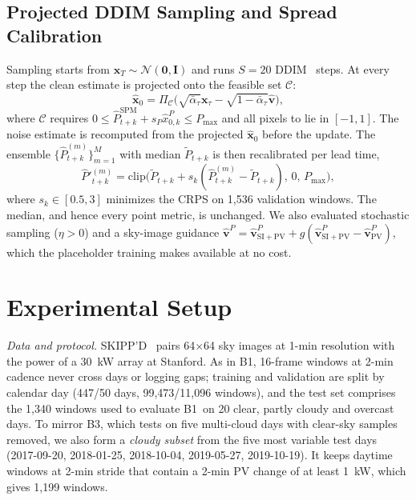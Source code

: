 \documentclass[conference]{IEEEtran}
\newcommand{\Pspm}{\hat P^{\mathrm{SPM}}}
\newcommand{\BOne}{B1}
\newcommand{\BThree}{B3}
\begin{document}
\subsection{Projected DDIM Sampling and Spread Calibration}
Sampling starts from $\mathbf x_T\sim\mathcal N(\mathbf 0,\mathbf I)$ and runs $S=20$ DDIM~\cite{song2021ddim} steps. At every step the clean estimate is projected onto the feasible set $\mathcal C$:
\begin{equation}
\hat{\mathbf x}_0=\Pi_{\mathcal C}\big(\sqrt{\bar\alpha_\tau}\mathbf x_\tau-\sqrt{1-\bar\alpha_\tau}\hat{\mathbf v}\big),
\end{equation}
where $\mathcal C$ requires $0\le\Pspm_{t+k}+s_P\hat x^P_{0,k}\le P_{\max}$ and all pixels to lie in $[-1,1]$. The noise estimate is recomputed from the projected $\hat{\mathbf x}_0$ before the update. The ensemble $\{\hat P^{(m)}_{t+k}\}_{m=1}^{M}$ with median $\tilde P_{t+k}$ is then recalibrated per lead time,
\begin{equation}
\hat P'^{(m)}_{t+k}=\mathrm{clip}\big(\tilde P_{t+k}+s_k(\hat P^{(m)}_{t+k}-\tilde P_{t+k}),\,0,\,P_{\max}\big),
\label{eq:cal}
\end{equation}
where $s_k\in[0.5,3]$ minimizes the CRPS on 1{,}536 validation windows. The median, and hence every point metric, is unchanged. We also evaluated stochastic sampling ($\eta>0$) and a sky-image guidance $\hat{\mathbf v}^P=\hat{\mathbf v}^P_{\mathrm{SI+PV}}+g(\hat{\mathbf v}^P_{\mathrm{SI+PV}}-\hat{\mathbf v}^P_{\mathrm{PV}})$, which the placeholder training makes available at no cost.

\section{Experimental Setup}
\emph{Data and protocol.} SKIPP'D~\cite{nie2023skippd} pairs 64$\times$64 sky images at 1-min resolution with the power of a \SI{30}{kW} array at Stanford. As in \BOne, 16-frame windows at 2-min cadence never cross days or logging gaps; training and validation are split by calendar day (447/50 days, 99{,}473/11{,}096 windows), and the test set comprises the 1{,}340 windows used to evaluate \BOne\ on 20 clear, partly cloudy and overcast days. To mirror \BThree, which tests on five multi-cloud days with clear-sky samples removed, we also form a \emph{cloudy subset} from the five most variable test days (2017-09-20, 2018-01-25, 2018-10-04, 2019-05-27, 2019-10-19). It keeps daytime windows at 2-min stride that contain a 2-min PV change of at least \SI{1}{kW}, which gives 1{,}199 windows.
\end{document}
